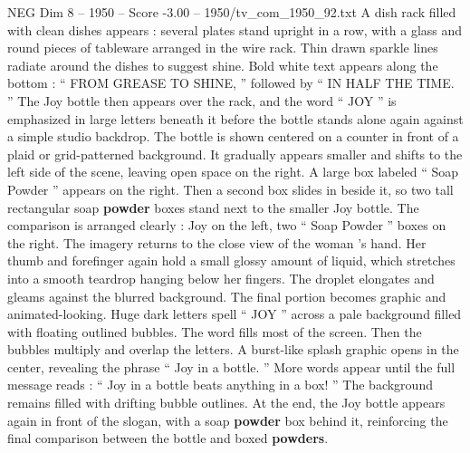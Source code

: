 \begin{textsample}{NEG Dim 8 – 1950 – Score -3.00 – 1950/tv\_com\_1950\_92.txt}
A dish rack filled with clean dishes appears : several plates stand upright in a row, with a glass and round pieces of tableware arranged in the wire rack.
Thin drawn sparkle lines radiate around the dishes to suggest shine.
Bold white text appears along the bottom : “ FROM GREASE TO SHINE, ” followed by “ IN HALF THE TIME. ” The Joy bottle then appears over the rack, and the word “ JOY ” is emphasized in large letters beneath it before the bottle stands alone again against a simple studio backdrop.
The bottle is shown centered on a counter in front of a plaid or grid-patterned background.
It gradually appears smaller and shifts to the left side of the scene, leaving open space on the right.
A large box labeled “ Soap Powder ” appears on the right.
Then a second box slides in beside it, so two tall rectangular soap \textbf{powder} boxes stand next to the smaller Joy bottle.
The comparison is arranged clearly : Joy on the left, two “ Soap Powder ” boxes on the right.
The imagery returns to the close view of the woman ’s hand.
Her thumb and forefinger again hold a small glossy amount of liquid, which stretches into a smooth teardrop hanging below her fingers.
The droplet elongates and gleams against the blurred background.
The final portion becomes graphic and animated-looking.
Huge dark letters spell “ JOY ” across a pale background filled with floating outlined bubbles.
The word fills most of the screen.
Then the bubbles multiply and overlap the letters.
A burst-like splash graphic opens in the center, revealing the phrase “ Joy in a bottle. ” More words appear until the full message reads : “ Joy in a bottle beats anything in a box! ” The background remains filled with drifting bubble outlines.
At the end, the Joy bottle appears again in front of the slogan, with a soap \textbf{powder} box behind it, reinforcing the final comparison between the bottle and boxed \textbf{powders}.

\end{textsample}
